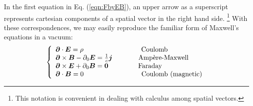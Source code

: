In the first equation in Eq. (\ref{eqn:FbyEB}), an upper arrow as a
superscript represents cartesian components of a spatial vector
in the right hand side.
\footnote{%
This notation is convenient in dealing with
calculus among spatial vectors.
}
With these correspondences, we may easily reproduce
the familiar form of Maxwell's equations in a vacuum:
\[
\left\{
\begin{array}{l}
\bld{\partial}\cdot \bld{E} =  \rho 
\hspace{30mm}\mbox{Coulomb}
\\
\bld{\partial} \times \bld{B}  - \partial_0 \bld{E} = \frac{1}{c}\bld{j}
\hspace{13.5mm}\mbox{Amp\`ere-Maxwell}
\\
\bld{\partial} \times \bld{E}  +  \partial_0 \bld{B} = \bld{0}
\hspace{15.5mm}\mbox{Faraday}
\\
\bld{\partial}\cdot \bld{B} = 0
\hspace{30mm}\mbox{Coulomb (magnetic)}
\\
\end{array}
\right.
\]

